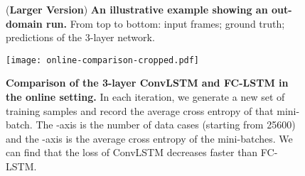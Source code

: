 \documentclass{article} \usepackage{amsmath}
\begin{document}
\begin{figure}[!h]
\centering
{}\vspace{-1em}
\vspace{-1em}
\caption{(\textbf{Larger Version}) \textbf{An illustrative example showing an out-domain run.} From top to bottom: input frames; ground truth; predictions of the 3-layer network.}
\label{fig:movingmnist-outdomain}
\end{figure}

\begin{figure}[!t]
\centering
\texttt{[image: online-comparison-cropped.pdf]}
\caption{\textbf{Comparison of the 3-layer ConvLSTM and FC-LSTM in the online setting.} In each iteration, we generate a new set of training samples and record the average cross entropy of that mini-batch. The -axis is the number of data cases (starting from 25600) and the -axis is the average cross entropy of the mini-batches. We can find that the loss of ConvLSTM decreases faster than FC-LSTM.}
\label{fig:movingmnist-online}
\end{figure}
\end{document}
